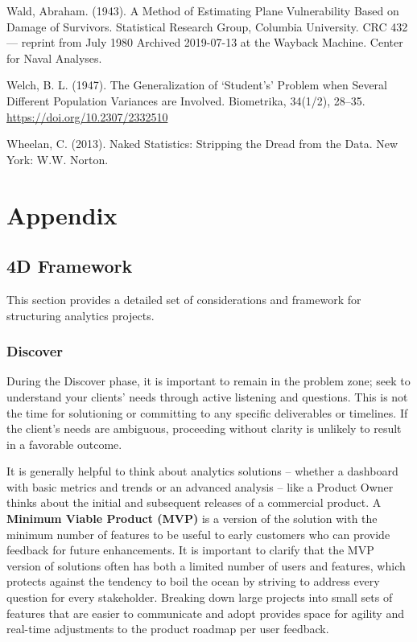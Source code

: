 \documentclass[
]{book}
\begin{document}
Wald, Abraham. (1943). A Method of Estimating Plane Vulnerability Based on Damage of Survivors. Statistical Research Group, Columbia University. CRC 432 --- reprint from July 1980 Archived 2019-07-13 at the Wayback Machine. Center for Naval Analyses.

Welch, B. L. (1947). The Generalization of `Student's' Problem when Several Different Population Variances are Involved. Biometrika, 34(1/2), 28--35. \url{https://doi.org/10.2307/2332510}

Wheelan, C. (2013). Naked Statistics: Stripping the Dread from the Data. New York: W.W. Norton.

\hypertarget{appendix}{%
\chapter{Appendix}\label{appendix}}

\hypertarget{d-framework-1}{%
\section{4D Framework}\label{d-framework-1}}

This section provides a detailed set of considerations and framework for structuring analytics projects.

\hypertarget{discover}{%
\subsection{Discover}\label{discover}}

During the Discover phase, it is important to remain in the problem zone; seek to understand your clients' needs through active listening and questions. This is not the time for solutioning or committing to any specific deliverables or timelines. If the client's needs are ambiguous, proceeding without clarity is unlikely to result in a favorable outcome.

It is generally helpful to think about analytics solutions -- whether a dashboard with basic metrics and trends or an advanced analysis -- like a Product Owner thinks about the initial and subsequent releases of a commercial product. A \textbf{Minimum Viable Product (MVP)} is a version of the solution with the minimum number of features to be useful to early customers who can provide feedback for future enhancements. It is important to clarify that the MVP version of solutions often has both a limited number of users and features, which protects against the tendency to boil the ocean by striving to address every question for every stakeholder. Breaking down large projects into small sets of features that are easier to communicate and adopt provides space for agility and real-time adjustments to the product roadmap per user feedback.
\end{document}

